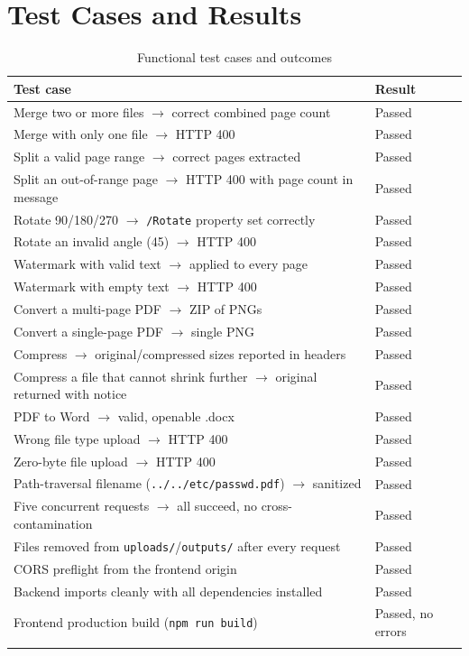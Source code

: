 \documentclass[12pt,a4paper]{report}
\begin{document}
\section{Test Cases and Results}
\begin{longtable}{@{}p{9cm}p{2.2cm}@{}}
\toprule
\textbf{Test case} & \textbf{Result} \\
\midrule
\endhead
Merge two or more files $\rightarrow$ correct combined page count & Passed \\
Merge with only one file $\rightarrow$ HTTP 400 & Passed \\
Split a valid page range $\rightarrow$ correct pages extracted & Passed \\
Split an out-of-range page $\rightarrow$ HTTP 400 with page count in message & Passed \\
Rotate 90/180/270 $\rightarrow$ \texttt{/Rotate} property set correctly & Passed \\
Rotate an invalid angle (45) $\rightarrow$ HTTP 400 & Passed \\
Watermark with valid text $\rightarrow$ applied to every page & Passed \\
Watermark with empty text $\rightarrow$ HTTP 400 & Passed \\
Convert a multi-page PDF $\rightarrow$ ZIP of PNGs & Passed \\
Convert a single-page PDF $\rightarrow$ single PNG & Passed \\
Compress $\rightarrow$ original/compressed sizes reported in headers & Passed \\
Compress a file that cannot shrink further $\rightarrow$ original returned with notice & Passed \\
PDF to Word $\rightarrow$ valid, openable .docx & Passed \\
Wrong file type upload $\rightarrow$ HTTP 400 & Passed \\
Zero-byte file upload $\rightarrow$ HTTP 400 & Passed \\
Path-traversal filename (\texttt{../../etc/passwd.pdf}) $\rightarrow$ sanitized & Passed \\
Five concurrent requests $\rightarrow$ all succeed, no cross-contamination & Passed \\
Files removed from \texttt{uploads/}/\texttt{outputs/} after every request & Passed \\
CORS preflight from the frontend origin & Passed \\
Backend imports cleanly with all dependencies installed & Passed \\
Frontend production build (\texttt{npm run build}) & Passed, no errors \\
\bottomrule
\caption{Functional test cases and outcomes}
\label{tab:tests}
\end{longtable}
\end{document}
